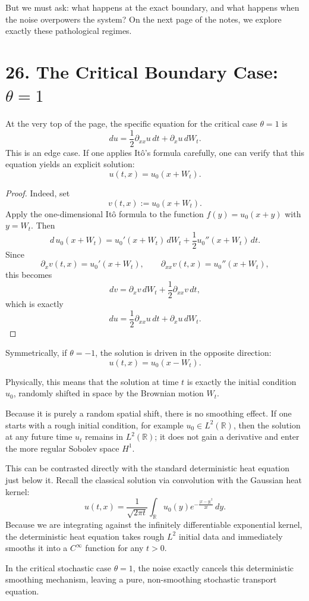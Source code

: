 \documentclass[11pt]{article}
\theoremstyle{definition}
\theoremstyle{remark}
\begin{document}
But we must ask: what happens at the exact boundary, and what happens when the noise overpowers the system? On the next page of the notes, we explore exactly these pathological regimes.

\section*{26. The Critical Boundary Case: $\theta=1$}
At the very top of the page, the specific equation for the critical case $\theta=1$ is
\[
du=\frac{1}{2}\partial_{xx}u\,dt+\partial_x u\,dW_t.
\]
This is an edge case. If one applies It\^o's formula carefully, one can verify that this equation yields an explicit solution:
\[
u(t,x)=u_0(x+W_t).
\]
\begin{proof}
Indeed, set
\[
v(t,x):=u_0(x+W_t).
\]
Apply the one-dimensional It\^o formula to the function \(f(y)=u_0(x+y)\) with \(y=W_t\). Then
\[
d\,u_0(x+W_t)
=u_0'(x+W_t)\,dW_t+\frac12 u_0''(x+W_t)\,dt.
\]
Since
\[
\partial_x v(t,x)=u_0'(x+W_t),\qquad
\partial_{xx}v(t,x)=u_0''(x+W_t),
\]
this becomes
\[
dv=\partial_x v\,dW_t+\frac12 \partial_{xx}v\,dt,
\]
which is exactly
\[
du=\frac12 \partial_{xx}u\,dt+\partial_x u\,dW_t.
\]
\end{proof}
Symmetrically, if $\theta=-1$, the solution is driven in the opposite direction:
\[
u(t,x)=u_0(x-W_t).
\]

Physically, this means that the solution at time $t$ is exactly the initial condition $u_0$, randomly shifted in space by the Brownian motion $W_t$.

Because it is purely a random spatial shift, there is no smoothing effect. If one starts with a rough initial condition, for example $u_0\in L^2(\mathbb{R})$, then the solution at any future time $u_t$ remains in $L^2(\mathbb{R})$; it does not gain a derivative and enter the more regular Sobolev space $H^1$.

This can be contrasted directly with the standard deterministic heat equation just below it. Recall the classical solution via convolution with the Gaussian heat kernel:
\[
u(t,x)=\frac{1}{\sqrt{2\pi t}}\int_{\mathbb{R}}u_0(y)e^{-\frac{|x-y|^2}{2t}}\,dy.
\]
Because we are integrating against the infinitely differentiable exponential kernel, the deterministic heat equation takes rough $L^2$ initial data and immediately smooths it into a $C^\infty$ function for any $t>0$.

In the critical stochastic case $\theta=1$, the noise exactly cancels this deterministic smoothing mechanism, leaving a pure, non-smoothing stochastic transport equation.
\end{document}
